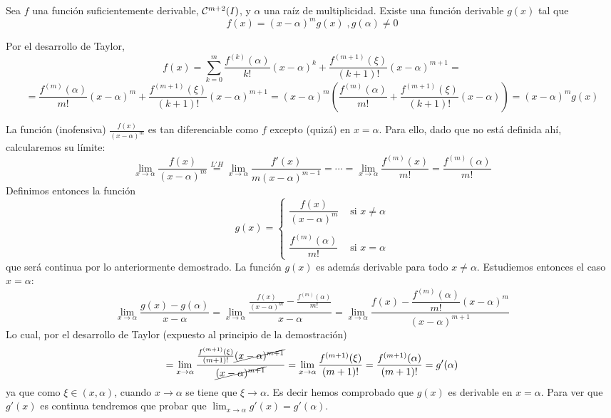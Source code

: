     \begin{lem}
  Sea $f$ una función suficientemente derivable, $\mathcal{C}^{m+2}(I)$, y $\alpha$ una raíz de multiplicidad. Existe una función derivable $g(x)$ tal que 
$$f(x)=(x-\alpha)^m g(x) \; , g(\alpha) \neq 0$$
    \end{lem}
   \begin{dem}
        Por el desarrollo de Taylor,
        $$f(x)=\sum_{k=0}^m\dfrac{f^{(k)}(\alpha)}{k!}(x-\alpha)^k+\dfrac{f^{(m+1)}(\xi)}{(k+1)!}(x-\alpha)^{m+1}=$$
        $$=\dfrac{f^{(m)}(\alpha)}{m!}(x-\alpha)^m+\dfrac{f^{(m+1)}(\xi)}{(k+1)!}(x-\alpha)^{m+1}=(x-\alpha)^m\left(\frac{f^{(m)}(\alpha)}{m!}+\dfrac{f^{(m+1)}(\xi)}{(k+1)!}(x-\alpha)\right)=(x-\alpha)^m g(x)$$
        
        La función (inofensiva) $\frac{f(x)}{(x-\alpha)^m}$ es tan diferenciable como $f$ excepto (quizá) en $x=\alpha$. Para ello, dado que no está definida ahí, calcularemos su límite:
        $$\lim_{x \to \alpha}\dfrac{f(x)}{(x-\alpha)^m}\overset{L'H}{=}\lim_{x \to \alpha}\dfrac{f'(x)}{m(x-\alpha)^{m-1}}= \cdots = \lim_{x \to \alpha} \dfrac{f^{(m)}(x)}{m!}=\dfrac{f^{(m)}(\alpha)}{m!}$$
        Definimos entonces la función
        $$g(x)=\left\{\begin{array}{cc}
           \dfrac{f(x)}{(x-\alpha)^m}  & \text{ si } x\neq \alpha \\
           & \\
            \dfrac{f^{(m)}(\alpha)}{m!} & \text{ si } x=\alpha 
        \end{array}\right.$$
        que será continua por lo anteriormente demostrado. La función $g(x)$ es además derivable para todo $x \neq \alpha$. Estudiemos entonces el caso $x=\alpha$:
        $$\lim_{x\to \alpha}\dfrac{g(x)-g(\alpha)}{x-\alpha}=\lim_{x \to \alpha}\dfrac{\frac{f(x)}{(x-\alpha)^m}-\frac{f^{(m)}(\alpha)}{m!} }{x-\alpha}=\lim_{x \to \alpha}\dfrac{f(x)-\dfrac{f^{(m)}(\alpha)}{m!} (x-\alpha)^m}{(x-\alpha)^{m+1}}$$
        Lo cual, por el desarrollo de Taylor (expuesto al principio de la demostración)
        $$=\lim_{x\to\alpha}\dfrac{\frac{f^{(m+1)}(\xi)}{(m+1)!}\cancel{(x-\alpha)^{m+1}}}{\cancel{(x-\alpha)^{m+1}}}=\lim_{x\to\alpha}\frac{f^{(m+1)}(\xi)}{(m+1)!}=\frac{f^{(m+1)}(\alpha)}{(m+1)!}=g'(\alpha)$$
        ya que como $\xi\in(x,\alpha)$, cuando $x\to \alpha$ se tiene que $\xi\to\alpha$. Es decir hemos comprobado que $g(x)$ es derivable en $x=\alpha$. Para ver que $g'(x)$ es continua tendremos que probar que $\displaystyle \lim_{x\to \alpha}g'(x)=g'(\alpha)$.
        

\end{dem}
